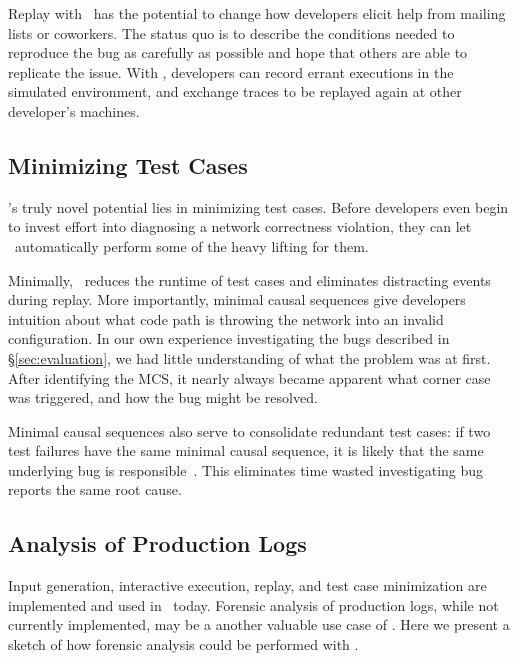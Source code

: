 Replay with \projectname~has the potential to change how developers elicit help from
mailing lists or coworkers. The status quo is to describe the conditions needed to
reproduce the bug as carefully as possible and hope that others are able
to replicate the issue. With \projectname, developers can record errant executions in the simulated
environment, and exchange traces to be replayed again at other
developer's machines.

\subsection{Minimizing Test Cases}

\projectname's truly novel potential lies in minimizing test cases.
Before developers even begin to invest effort into diagnosing a network
correctness violation, they can let \simulator~automatically perform some of
the heavy lifting for them.

Minimally, \simulator~reduces the runtime of test cases and eliminates
distracting events during replay. More importantly, minimal causal sequences
give developers intuition about what code path is throwing
the network into an invalid configuration. In our own experience
investigating the bugs described in \S\ref{sec:evaluation}, we had little
understanding of what the problem was at first. After identifying the MCS, it
nearly always became apparent what corner case was triggered, and how the
bug might be resolved.

Minimal causal sequences also serve to consolidate redundant test cases:
if two test failures have the same minimal causal sequence, it is
likely that the same underlying bug is
responsible~\cite{Zeller:2002:SIF:506201.506206}.
This eliminates time wasted
investigating bug reports the same root cause.

\subsection{Analysis of Production Logs}

Input generation, interactive execution, replay, and test case
minimization are implemented and used in \projectname~today.
Forensic analysis of production logs, while not currently implemented,
may be a another valuable use case of \projectname. Here we present a sketch of
how forensic analysis could be performed with \simulator.

